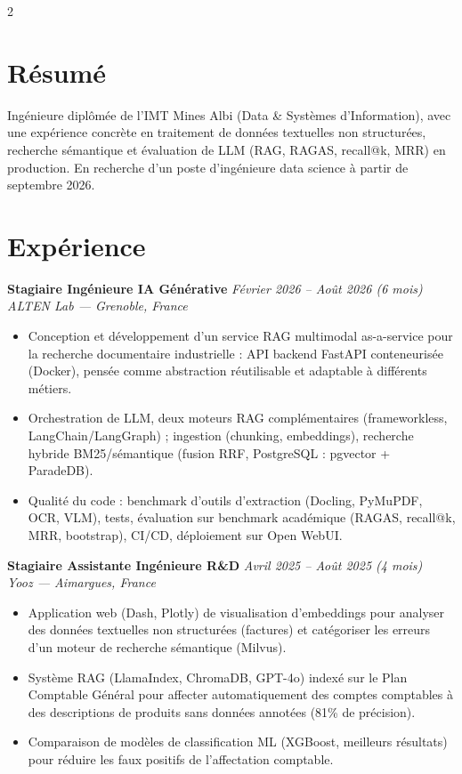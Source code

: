 \documentclass[10.5pt,a4paper]{article}
\newcommand{\sectionrule}{\vspace{-6pt}{\color{accent}\hrule height 1pt}\vspace{2pt}}
\newcommand{\cvexp}[5]{%
  \noindent\textbf{#1} \hfill {\itshape\color{graytext}\small #4}\\
  {\itshape #2 --- #3}\\[-2pt]
  #5
  \vspace{5pt}
}
\begin{document}
\setlength{\columnsep}{1.5em}
\begin{paracol}{2}

\section*{Résumé}
\sectionrule
\justifying
Ingénieure diplômée de l'IMT Mines Albi (Data \& Systèmes d'Information), avec une expérience concrète en traitement de données textuelles non structurées, recherche sémantique et évaluation de LLM (RAG, RAGAS, recall@k, MRR) en production. En recherche d'un poste d'ingénieure data science à partir de septembre 2026.

\section*{Expérience}
\sectionrule

\cvexp{Stagiaire Ingénieure IA Générative}{ALTEN Lab}{Grenoble, France}{Février 2026 -- Août 2026 (6 mois)}{%
  \begin{itemize}[leftmargin=12pt, itemsep=2pt, topsep=0pt, partopsep=0pt, parsep=0pt]
    \item Conception et développement d'un service RAG multimodal as-a-service pour la recherche documentaire industrielle : API backend FastAPI conteneurisée (Docker), pensée comme abstraction réutilisable et adaptable à différents métiers.
    \item Orchestration de LLM, deux moteurs RAG complémentaires (frameworkless, LangChain/\allowbreak LangGraph) ; ingestion (chunking, embeddings), recherche hybride BM25/sémantique (fusion RRF, PostgreSQL : pgvector + ParadeDB).
    \item Qualité du code : benchmark d'outils d'extraction (Docling, PyMuPDF, OCR, VLM), tests, évaluation sur benchmark académique (RAGAS, recall@k, MRR, bootstrap), CI/CD, déploiement sur Open WebUI.
  \end{itemize}
}

\cvexp{Stagiaire Assistante Ingénieure R\&D}{Yooz}{Aimargues, France}{Avril 2025 -- Août 2025 (4 mois)}{%
  \begin{itemize}[leftmargin=12pt, itemsep=2pt, topsep=0pt, partopsep=0pt, parsep=0pt]
    \item Application web (Dash, Plotly) de visualisation d'embeddings pour analyser des données textuelles non structurées (factures) et catégoriser les erreurs d'un moteur de recherche sémantique (Milvus).
    \item Système RAG (LlamaIndex, ChromaDB, GPT-4o) indexé sur le Plan Comptable Général pour affecter automatiquement des comptes comptables à des descriptions de produits sans données annotées (81\% de précision).
    \item Comparaison de modèles de classification ML (XGBoost, meilleurs résultats) pour réduire les faux positifs de l'affectation comptable.
  \end{itemize}
}


\end{paracol}
\end{document}
